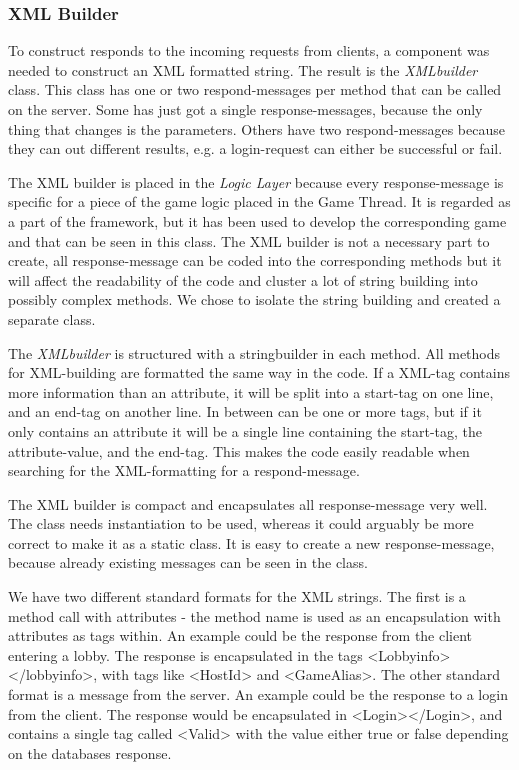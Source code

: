 \subsubsection{XML Builder}
\label{sec:xmlbuilderimpl}
To construct responds to the incoming requests from clients, a component was needed to construct an XML formatted string. The result is the \textit{XMLbuilder} class. This class has one or two respond-messages per method that can be called on the server. Some has just got a single response-messages, because the only thing that changes is the parameters. Others have two respond-messages because they can out different results, e.g. a login-request can either be successful or fail. 

The XML builder is placed in the \textit{Logic Layer} because every response-message is specific for a piece of the game logic placed in the Game Thread. It is regarded as a part of the framework, but it has been used to develop the corresponding game and that can be seen in this class. The XML builder is not a necessary part to create, all response-message can be coded into the corresponding methods but it will affect the readability of the code and cluster a lot of string building into possibly complex methods. We chose to isolate the string building and created a separate class.

The \textit{XMLbuilder} is structured with a stringbuilder in each method. All methods for XML-building are formatted the same way in the code. If a XML-tag contains more information than an attribute, it will be split into a start-tag on one line, and an end-tag on another line. In between can be one or more tags, but if it only contains an attribute it will be a single line containing the start-tag, the attribute-value, and the end-tag. This makes the code easily readable when searching for the XML-formatting for a respond-message. 

The XML builder is compact and encapsulates all response-message very well. The class needs instantiation to be used, whereas it could arguably be more correct to make it as a static class. It is easy to create a new response-message, because already existing messages can be seen in the class.

We have two different standard formats for the XML strings. The first is a method call with attributes - the method name is used as an encapsulation with attributes as tags within. An example could be the response from the client entering a lobby. The response is encapsulated in the tags <Lobbyinfo></lobbyinfo>, with tags like <HostId> and <GameAlias>. The other standard format is a message from the server. An example could be the response to a login from the client. The response would be encapsulated in <Login></Login>, and contains a single tag called <Valid> with the value either true or false depending on the databases response.

